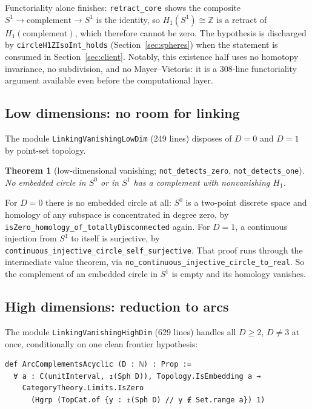 \documentclass[11pt]{article}
\newtheorem{theorem}{Theorem}[section]
\theoremstyle{remark}
\newcommand{\Z}{\mathbb{Z}}
\newcommand{\leanname}[1]{\texttt{#1}}
\begin{document}
Functoriality alone finishes: \leanname{retract\_core} shows the composite
$S^1 \to \mathrm{complement} \to S^1$ is the identity, so $H_1(S^1) \cong \Z$
is a retract of $H_1(\mathrm{complement})$, which therefore cannot be zero.
The hypothesis is discharged by \leanname{circleH1ZIsoInt\_holds}
(Section~\ref{sec:spheres}) when the statement is consumed in
Section~\ref{sec:client}. Notably, this existence half uses no homotopy
invariance, no subdivision, and no Mayer--Vietoris: it is a 308-line
functoriality argument available even before the computational layer.

\subsection{Low dimensions: no room for linking}

The module \leanname{LinkingVanishingLowDim} (249 lines) disposes of
$D = 0$ and $D = 1$ by point-set topology.

\begin{theorem}[low-dimensional vanishing; \leanname{not\_detects\_zero},
\leanname{not\_detects\_one}]\label{thm:lowdim}
No embedded circle in $S^0$ or in $S^1$ has a complement with nonvanishing
$H_1$.
\end{theorem}

For $D = 0$ there is no embedded circle at all: $S^0$ is a two-point
discrete space and homology of any subspace is concentrated in degree zero,
by \leanname{isZero\_homology\_of\_totallyDisconnected} again. For $D = 1$,
a continuous injection from $S^1$ to itself is surjective, by
\leanname{continuous\_injective\_circle\_self\_surjective}. That proof
runs through the intermediate value theorem, via
\leanname{no\_continuous\_injective\_circle\_to\_real}. So the complement
of an embedded circle in $S^1$ is empty and its homology vanishes.

\subsection{High dimensions: reduction to arcs}

The module \leanname{LinkingVanishingHighDim} (629 lines) handles all
$D \ge 2$, $D \ne 3$ at once, conditionally on one clean frontier
hypothesis:

\begin{lstlisting}
def ArcComplementsAcyclic (D : ℕ) : Prop :=
  ∀ a : C(unitInterval, ↥(Sph D)), Topology.IsEmbedding a →
    CategoryTheory.Limits.IsZero
      (Hgrp (TopCat.of {y : ↥(Sph D) // y ∉ Set.range a}) 1)
\end{lstlisting}
\end{document}
